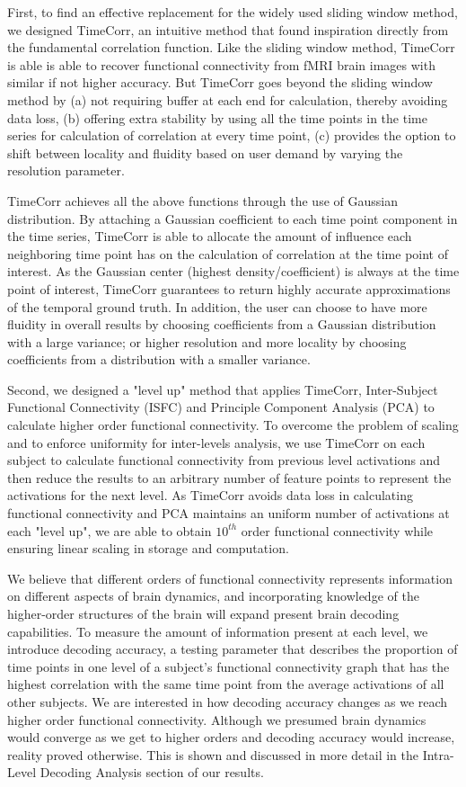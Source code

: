 \documentclass[12pt]{article}
\begin{document}
First, to find an effective replacement for the widely used sliding window method, we designed TimeCorr, an intuitive method that found inspiration directly from the fundamental correlation function. Like the sliding window method, TimeCorr is able is able to recover functional connectivity from fMRI brain images with similar if not higher accuracy. But TimeCorr goes beyond the sliding window method by (a) not requiring buffer at each end for calculation, thereby avoiding data loss, (b) offering extra stability by using all the time points in the time series for calculation of correlation at every time point, (c) provides the option to shift between locality and fluidity based on user demand by varying the resolution parameter.

TimeCorr achieves all the above functions through the use of Gaussian distribution. By attaching a Gaussian coefficient to each time point component in the time series, TimeCorr is able to allocate the amount of influence each neighboring time point has on the calculation of correlation at the time point of interest. As the Gaussian center (highest density/coefficient) is always at the time point of interest, TimeCorr guarantees to return highly accurate approximations of the temporal ground truth. In addition, the user can choose to have more fluidity in overall results by choosing coefficients from a Gaussian distribution with a large variance; or higher resolution and more locality by choosing coefficients from a distribution with a smaller variance.

Second, we designed a "level up" method that applies TimeCorr, Inter-Subject Functional Connectivity (ISFC) and Principle Component Analysis (PCA) to calculate higher order functional connectivity. To overcome the problem of scaling and to enforce uniformity for inter-levels analysis, we use TimeCorr on each subject to calculate functional connectivity from previous level activations and then reduce the results to an arbitrary number of feature points to represent the activations for the next level. As TimeCorr avoids data loss in calculating functional connectivity and PCA maintains an uniform number of activations at each "level up", we are able to obtain $10^{th}$ order functional connectivity while ensuring linear scaling in storage and computation.

We believe that different orders of functional connectivity represents information on different aspects of brain dynamics, and incorporating knowledge of the higher-order structures of the brain will expand present brain decoding capabilities. To measure the amount of information present at each level, we introduce decoding accuracy, a testing parameter that describes the proportion of time points in one level of a subject's functional connectivity graph that has the highest correlation with the same time point from the average activations of all other subjects. We are interested in how decoding accuracy changes as we reach higher order functional connectivity. Although we presumed brain dynamics would converge as we get to higher orders and decoding accuracy would increase, reality proved otherwise. This is shown and discussed in more detail in the Intra-Level Decoding Analysis section of our results.
\end{document}
